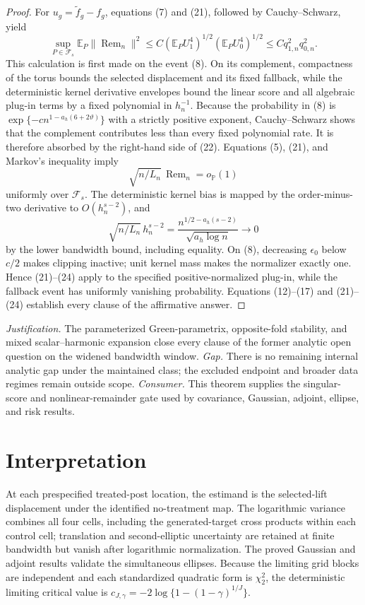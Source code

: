 \documentclass{article}
\begin{document}
\begin{proof}
For \(u_g=\widetilde f_g-f_g\), equations (7) and (21), followed by Cauchy--Schwarz, yield
\[
 \sup_{P\in\mathcal F_s}\mathbb E_P
 \lVert\operatorname{Rem}_n\rVert^2
 \leq C
 \left(\mathbb E_PU_1^4\right)^{1/2}
 \left(\mathbb E_PU_0^4\right)^{1/2}
 \leq Cq_{1,n}^2q_{0,n}^2.
\tag{22}
\]
This calculation is first made on the event (8).  On its complement, compactness of the torus bounds the selected displacement and its fixed fallback, while the deterministic kernel derivative envelopes bound the linear score and all algebraic plug-in terms by a fixed polynomial in \(h_n^{-1}\).  Because the probability in (8) is \(\exp\{-c n^{1-a_h(6+2\vartheta)}\}\) with a strictly positive exponent, Cauchy--Schwarz shows that the complement contributes less than every fixed polynomial rate.  It is therefore absorbed by the right-hand side of (22).
Equations (5), (21), and Markov's inequality imply
\[
 \sqrt{n/L_n}\,\operatorname{Rem}_n=o_{\mathbb P}(1)
\tag{23}
\]
uniformly over \(\mathcal F_s\).  The deterministic kernel bias is mapped by the order-minus-two derivative to \(O(h_n^{s-2})\), and
\[
 \sqrt{n/L_n}\,h_n^{s-2}
 =\frac{n^{1/2-a_h(s-2)}}{\sqrt{a_h\log n}}\longrightarrow0
\tag{24}
\]
by the lower bandwidth bound, including equality.  On (8), decreasing \(\epsilon_0\) below \(c/2\) makes clipping inactive; unit kernel mass makes the normalizer exactly one.  Hence (21)--(24) apply to the specified positive-normalized plug-in, while the fallback event has uniformly vanishing probability.  Equations (12)--(17) and (21)--(24) establish every clause of the affirmative answer.
\end{proof}
\par\smallskip\noindent \textit{Justification.} The parameterized Green-parametrix, opposite-fold stability, and mixed scalar--harmonic expansion close every clause of the former analytic open question on the widened bandwidth window. \textit{Gap.} There is no remaining internal analytic gap under the maintained class; the excluded endpoint and broader data regimes remain outside scope. \textit{Consumer.} This theorem supplies the singular-score and nonlinear-remainder gate used by covariance, Gaussian, adjoint, ellipse, and risk results.

\section{Interpretation}

At each prespecified treated-post location, the estimand is the selected-lift displacement under the identified no-treatment map.  The logarithmic variance combines all four cells, including the generated-target cross products within each control cell; translation and second-elliptic uncertainty are retained at finite bandwidth but vanish after logarithmic normalization.  The proved Gaussian and adjoint results validate the simultaneous ellipses.  Because the limiting grid blocks are independent and each standardized quadratic form is \(\chi^2_2\), the deterministic limiting critical value is \(c_{J,\gamma}=-2\log\{1-(1-\gamma)^{1/J}\}\).
\end{document}
